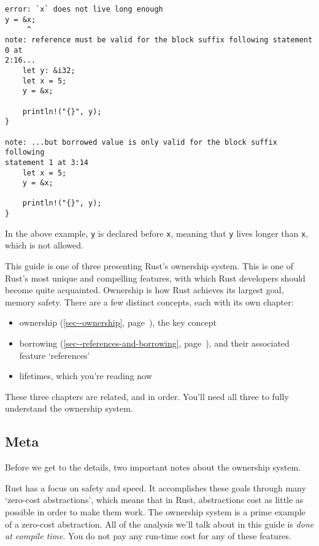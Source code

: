 \documentclass[a4paper,]{book}
\renewcommand*{\hyperref}[2][\ar]{%
  \def\ar{#2}%
  #2 (\autoref{#1}, page~\pageref{#1})}
\providecommand{\tightlist}{%
  \setlength{\itemsep}{0pt}\setlength{\parskip}{0pt}}
\begin{document}
\begin{verbatim}
error: `x` does not live long enough
y = &x;
     ^
note: reference must be valid for the block suffix following statement 0 at
2:16...
    let y: &i32;
    let x = 5;
    y = &x;
    
    println!("{}", y);
}

note: ...but borrowed value is only valid for the block suffix following
statement 1 at 3:14
    let x = 5;
    y = &x;
    
    println!("{}", y);
}
\end{verbatim}

In the above example, \texttt{y} is declared before \texttt{x}, meaning
that \texttt{y} lives longer than \texttt{x}, which is not allowed.


This guide is one of three presenting Rust's ownership system. This is
one of Rust's most unique and compelling features, with which Rust
developers should become quite acquainted. Ownership is how Rust
achieves its largest goal, memory safety. There are a few distinct
concepts, each with its own chapter:

\begin{itemize}
\tightlist
\item
  \hyperref[sec--ownership]{ownership}, the key concept
\item
  \hyperref[sec--references-and-borrowing]{borrowing}, and their
  associated feature `references'
\item
  lifetimes, which you're reading now
\end{itemize}

These three chapters are related, and in order. You'll need all three to
fully understand the ownership system.

\subsection{Meta}\label{meta-2}

Before we get to the details, two important notes about the ownership
system.

Rust has a focus on safety and speed. It accomplishes these goals
through many `zero-cost abstractions', which means that in Rust,
abstractions cost as little as possible in order to make them work. The
ownership system is a prime example of a zero-cost abstraction. All of
the analysis we'll talk about in this guide is \emph{done at compile
time}. You do not pay any run-time cost for any of these features.
\end{document}
